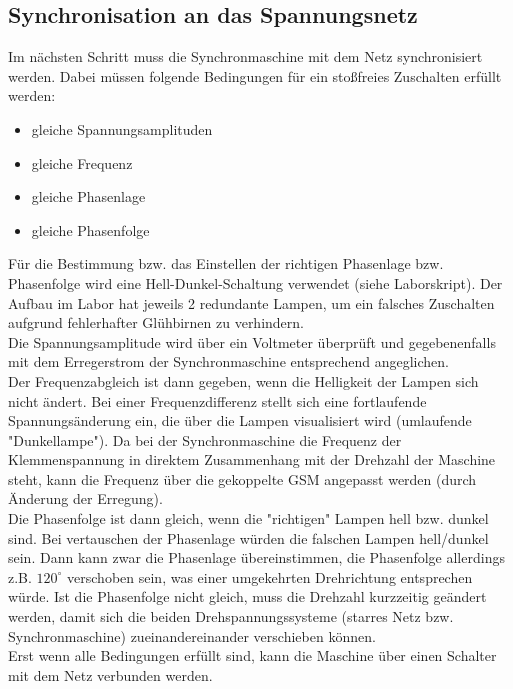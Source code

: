 \subsection{Synchronisation an das Spannungsnetz}
Im nächsten Schritt muss die Synchronmaschine mit dem Netz synchronisiert werden. Dabei müssen folgende Bedingungen für ein stoßfreies Zuschalten erfüllt werden:
\begin{itemize}
    \item gleiche Spannungsamplituden
    \item gleiche Frequenz
    \item gleiche Phasenlage
    \item gleiche Phasenfolge
\end{itemize}
Für die Bestimmung bzw. das Einstellen der richtigen Phasenlage bzw. Phasenfolge wird eine Hell-Dunkel-Schaltung verwendet (siehe Laborskript). Der Aufbau im Labor hat jeweils 2 redundante Lampen, um ein falsches Zuschalten aufgrund fehlerhafter Glühbirnen zu verhindern.\\
Die Spannungsamplitude wird über ein Voltmeter überprüft und gegebenenfalls mit dem Erregerstrom der Synchronmaschine entsprechend angeglichen.\\
Der Frequenzabgleich ist dann gegeben, wenn die Helligkeit der Lampen sich nicht ändert. Bei einer Frequenzdifferenz  stellt sich eine fortlaufende Spannungsänderung ein, die über die Lampen visualisiert wird (umlaufende "Dunkellampe"). Da bei der Synchronmaschine die Frequenz der Klemmenspannung in direktem Zusammenhang mit der Drehzahl der Maschine steht, kann die Frequenz über die gekoppelte GSM angepasst werden (durch Änderung der Erregung).\\
Die Phasenfolge ist dann gleich, wenn die "richtigen" Lampen hell bzw. dunkel sind. Bei vertauschen der Phasenlage würden die falschen Lampen hell/dunkel sein. Dann kann zwar die Phasenlage übereinstimmen, die Phasenfolge allerdings z.B. $120^{\circ}$ verschoben sein, was einer umgekehrten Drehrichtung entsprechen würde. Ist die Phasenfolge nicht gleich, muss die Drehzahl kurzzeitig geändert werden, damit sich die beiden Drehspannungssysteme (starres Netz bzw. Synchronmaschine) zueinandereinander verschieben können.\\
Erst wenn alle Bedingungen erfüllt sind, kann die Maschine über einen Schalter mit dem Netz verbunden werden.
